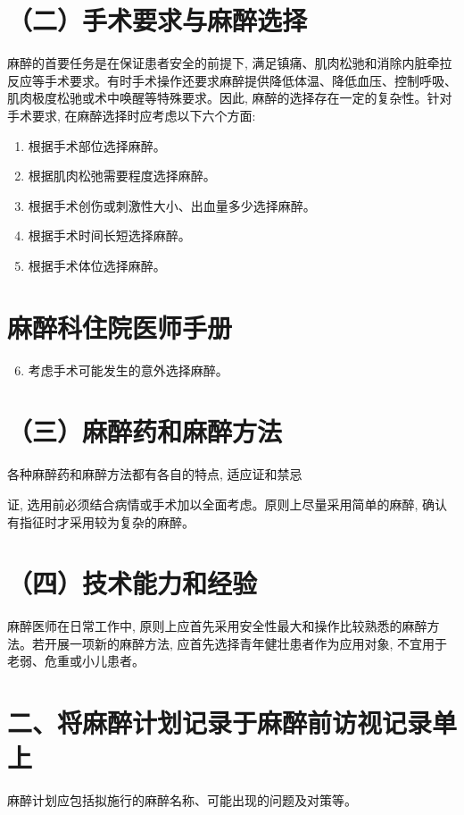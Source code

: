 \documentclass[10pt]{article}
\begin{document}
\section*{（二）手术要求与麻醉选择}
麻醉的首要任务是在保证患者安全的前提下, 满足镇痛、肌肉松驰和消除内脏牵拉反应等手术要求。有时手术操作还要求麻醉提供降低体温、降低血压、控制呼吸、肌肉极度松驰或术中唤醒等特殊要求。因此, 麻醉的选择存在一定的复杂性。针对手术要求, 在麻醉选择时应考虑以下六个方面:

\begin{enumerate}
  \item 根据手术部位选择麻醉。

  \item 根据肌肉松弛需要程度选择麻醉。

  \item 根据手术创伤或刺激性大小、出血量多少选择麻醉。

  \item 根据手术时间长短选择麻醉。

  \item 根据手术体位选择麻醉。

\end{enumerate}

\section*{麻醉科住院医师手册}
\begin{enumerate}
  \setcounter{enumi}{5}
  \item 考虑手术可能发生的意外选择麻醉。
\end{enumerate}

\section*{（三）麻醉药和麻醉方法}
各种麻醉药和麻醉方法都有各自的特点, 适应证和禁忌

证, 选用前必须结合病情或手术加以全面考虑。原则上尽量采用简单的麻醉, 确认有指征时才采用较为复杂的麻醉。

\section*{（四）技术能力和经验}
麻醉医师在日常工作中, 原则上应首先采用安全性最大和操作比较熟悉的麻醉方法。若开展一项新的麻醉方法, 应首先选择青年健壮患者作为应用对象, 不宜用于老弱、危重或小儿患者。

\section*{二、将麻醉计划记录于麻醉前访视记录单上}
麻醉计划应包括拟施行的麻醉名称、可能出现的问题及对策等。
\end{document}
